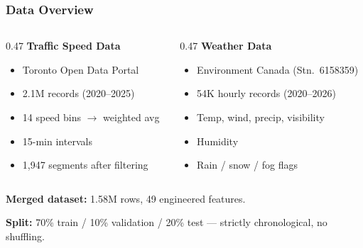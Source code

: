 \documentclass{beamer}
\begin{document}
\begin{frame}
\frametitle{Data Overview}

\begin{columns}[T]
\begin{column}{0.47\textwidth}
\textbf{Traffic Speed Data}
\begin{itemize}\setlength\itemsep{3pt}
  \item Toronto Open Data Portal
  \item 2.1M records (2020--2025)
  \item 14 speed bins $\rightarrow$ weighted avg
  \item 15-min intervals
  \item 1{,}947 segments after filtering
\end{itemize}
\end{column}
\begin{column}{0.47\textwidth}
\textbf{Weather Data}
\begin{itemize}\setlength\itemsep{3pt}
  \item Environment Canada (Stn.\ 6158359)
  \item 54K hourly records (2020--2026)
  \item Temp, wind, precip, visibility
  \item Humidity
  \item Rain / snow / fog flags
\end{itemize}
\end{column}
\end{columns}

\bigskip
\textbf{Merged dataset:} 1.58M rows, 49 engineered features.

\medskip
\textbf{Split:} 70\% train / 10\% validation / 20\% test --- strictly chronological, no shuffling.
\end{frame}
\end{document}
